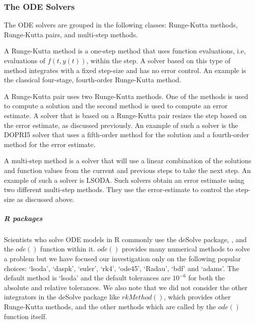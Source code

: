 \subsubsection{The ODE Solvers}
\label{subsection:numerical_software_used}
The ODE solvers are grouped in the following classes: Runge-Kutta methods, Runge-Kutta pairs, and multi-step methods.

A Runge-Kutta method is a one-step method that uses function evaluations, i.e, evaluations of $f(t, y(t))$, within the step. A solver based on this type of method integrates with a fixed step-size and has no error control. An example is the classical four-stage, fourth-order Runge-Kutta method.

A Runge-Kutta pair uses two Runge-Kutta methods. One of the methods is used to compute a solution and the second method is used to compute an error estimate. A solver that is based on a Runge-Kutta pair resizes the step based on the error estimate, as discussed previously. An example of such a solver is the DOPRI5 solver that uses a fifth-order method for the solution and a fourth-order method for the error estimate.

A multi-step method is a solver that will use a linear combination of the solutions and function values from the current and previous steps to take the next step. An example of such a solver is LSODA. Such solvers obtain an error estimate using two different multi-step methods. They use the error-estimate to control the step-size as discussed above.

\subparagraph{R packages}
Scientists who solve ODE models in R commonly use the deSolve package, \cite{soetaert2010solving}, and the $ode()$ function within it.
$ode()$ provides many numerical methods to solve a problem but we have focused our investigation only on the following popular choices: `lsoda', `daspk', `euler', `rk4', `ode45', `Radau', `bdf' and `adams'. The default method is `lsoda' and the default tolerances are $10^{-6}$ for both the absolute and relative tolerances. We also note that we did not consider the other integrators in the deSolve package like $rkMethod()$, which provides other Runge-Kutta methods, and the other methods which are called by the $ode()$ function itself.


